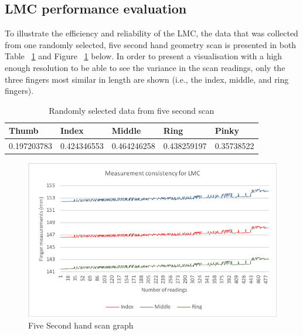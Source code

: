 
\subsection{LMC performance evaluation}

To illustrate the efficiency and reliability of the LMC, the data that was collected from one randomly selected, five second hand geometry scan is presented in both Table ~\ref{table: Randomly selected data from five second scan} and Figure ~\ref{fig:Five Second hand scan graph} below. 
In order to present a visualisation with a high enough resolution to be able to see the variance in the scan readings, only the three fingers most similar in length are shown (i.e., the index, middle, and ring fingers). 

    
    \begin{table}[h!]
    \caption{Randomly selected data from five second scan}
    \centering
     \begin{tabular}{|p{} | p{}| p{}| p{}| p{}|} 
     \hline
    	\textbf{Thumb} & \textbf{Index} & \textbf{Middle} & \textbf{Ring} & \textbf{Pinky} \\ [1ex] 
     \hline\hline 
     0.197203783 & 0.424346553 &  0.464246258 & 0.438259197 & 0.35738522 \\[1ex]
     \hline 
     \end{tabular}
     \label{table: Randomly selected data from five second scan}
    \end{table}

    
    \begin{figure}[htbp!] 
    \centering    
    \includegraphics[width=1.0\textwidth]{Chapter4/Figs/Consistency.png}
    \caption[Five Second hand scan graph]{Five Second hand scan graph}
    \label{fig:Five Second hand scan graph}
    \end{figure}
    
